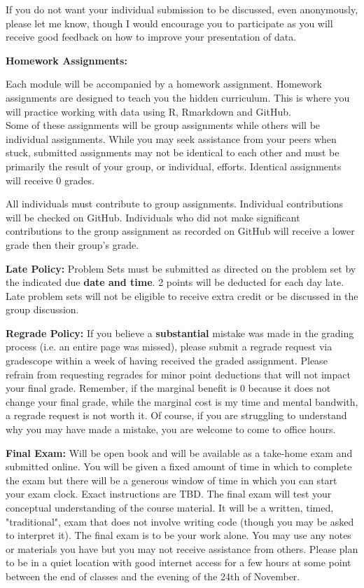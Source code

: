 \documentclass[a4paper, 10pt]{article}
\begin{document}
\noindent If you do not want your individual submission to be discussed, even anonymously, please let me know, though I would encourage you to participate as you will receive good feedback on how to improve your presentation of data. 

\noindent\textbf{Homework Assignments:}

\noindent Each module will be accompanied by a homework assignment. Homework assignments are designed to teach you the hidden curriculum. This is where you will practice working with data  using R, Rmarkdown and GitHub. \\
Some of these assignments will be group assignments while others will be individual assignments. While you may seek assistance from your peers when stuck, submitted assignments may not be identical to each other and must be primarily the result of your group, or individual, efforts. Identical assignments will receive 0 grades. 

\noindent All individuals must contribute to group assignments. Individual contributions will be checked on GitHub. Individuals who did not make significant contributions to the group assignment as recorded on GitHub will receive a lower grade then their group's grade.

\noindent\textbf{Late Policy:} Problem Sets must be submitted as directed on the problem set by the indicated due \textbf{date and time}. 2 points will be deducted for each day late. Late problem sets will not be eligible to receive extra credit or be discussed in the group discussion. 

\noindent\textbf{Regrade Policy:} If you believe a \textbf{substantial} mistake was made in the grading process (i.e. an entire page was missed), please submit a regrade request via gradescope within a week of having received the graded assignment. Please refrain from requesting regrades for minor point deductions that will not impact your final grade. Remember, if the marginal benefit is 0 because it does not change your final grade, while the marginal cost is my time and mental bandwith, a regrade request is not worth it. Of course, if you are struggling to understand why you may have made a mistake, you are welcome to come to office hours.  

\noindent\textbf{Final Exam:} Will be open book and will be available as a take-home exam and submitted online. You will be given a fixed amount of time in which to complete the exam but there will be a generous window of time  in which you can start your exam clock. Exact instructions are TBD.  The final exam will test your conceptual understanding of the course material. It will be a written, timed, "traditional", exam that does not involve writing code (though you may be asked to interpret it). The final exam is to be your work alone. You may use any notes or materials you have but you may not receive assistance from others. Please plan to be in a quiet location with good internet access for a few hours at some point between the end of classes and the evening of the 24th of November. 
\end{document}
